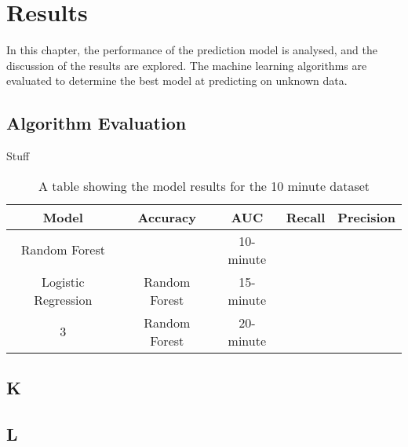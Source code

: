 \chapter{Results}\label{ch:results}

In this chapter, the performance of the prediction model is analysed, and the discussion of the results are explored.
The machine learning algorithms are evaluated to determine the best model at predicting on unknown data.

\section{Algorithm Evaluation}\label{sec:Algorithm Evaluation}

Stuff

\begin{table}[h!]
\centering
\caption{A table showing the model results for the 10 minute dataset}
\begin{tabular}{ c c c c c }
 \hline
 Model & Accuracy & AUC & Recall & Precision \\ [0.5ex]
 \hline
 Random Forest &  & 10-minute \\
 Logistic Regression & Random Forest & 15-minute \\
 3 & Random Forest & 20-minute \\ [1ex]
 \hline
\end{tabular}
\label{tab:ModelResults10}
\end{table}

\section{K}\label{sec:K}


\section{L}\label{sec:L}

